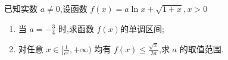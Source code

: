 \documentclass[class=ctexart,crop=false]{standalone}
\begin{document}
已知实数 $a\neq 0$,设函数 $f(x)=a\ln{x}+\sqrt{1+x},x>0$
\begin{enumerate}[label=(\Roman*)]
    \item 当 $a=-\frac{3}{4}$ 时,求函数 $f(x)$的单调区间;
    \item 对任意 $x \in [ \frac{1}{e^2},+\infty ) $ 均有
    $f(x)\leqslant \frac{\sqrt{x}}{2a}$,求 $a$ 的取值范围.
\end{enumerate}
\end{document}
